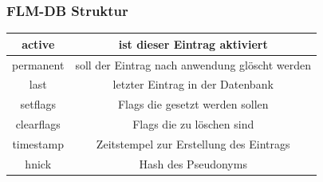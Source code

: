
\begin{frame}
	\frametitle{FLM-DB Struktur}
\begin{tabular}{|c|c|}
\hline active     & ist dieser Eintrag aktiviert \\ 
\hline permanent  & soll der Eintrag nach anwendung glöscht werden \\ 
\hline last       & letzter Eintrag in der Datenbank \\ 
\hline setflags   & Flags die gesetzt werden sollen \\ 
\hline clearflags & Flags die zu löschen sind \\
\hline timestamp  & Zeitstempel zur Erstellung des Eintrags \\
\hline hnick      & Hash des Pseudonyms \\
\hline 
\end{tabular} 
\end{frame}
